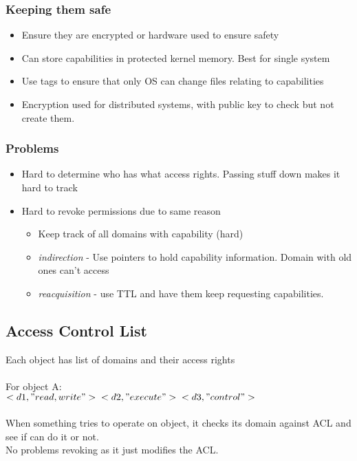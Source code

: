 \documentclass{article}
\begin{document}
		\subsubsection{Keeping them safe}
			\begin{itemize}
				\item Ensure they are encrypted or hardware used to ensure safety
				\item Can store capabilities in protected kernel memory. Best for single system
				\item Use tags to ensure that only OS can change files relating to capabilities
				\item Encryption used for distributed systems, with public key to check but not create them.
			\end{itemize}
			
		\subsubsection{Problems}
			\begin{itemize}
				\item Hard to determine who has what access rights. Passing stuff down makes it hard to track
				\item Hard to revoke permissions due to same reason
				\begin{itemize}
					\item Keep track of all domains with capability (hard)
					\item \textit{indirection} - Use pointers to hold capability information. Domain with old ones can't access
					\item \textit{reacquisition} - use TTL and have them keep requesting capabilities.
				\end{itemize}
			\end{itemize}
	
	\subsection{Access Control List}
		Each object has list of domains and their access rights\\\\
		For object A:\\
		$<d1, "read, write"> \\<d2, "execute"> \\<d3, "control">$\\\\
		When something tries to operate on object, it checks its domain against ACL and see if can do it or not.\\
		No problems revoking as it just modifies the ACL.
		
\end{document}

